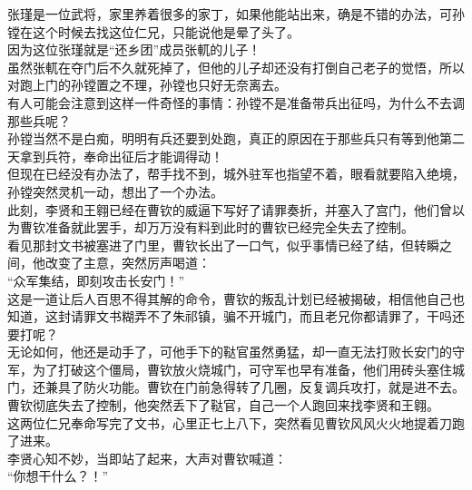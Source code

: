 \begin{multicols}{\theparacolNo}
张瑾是一位武将，家里养着很多的家丁，如果他能站出来，确是不错的办法，可孙镗在这个时候去找这位仁兄，只能说他是晕了头了。\\

因为这位张瑾就是“还乡团”成员张軏的儿子！\\

虽然张軏在夺门后不久就死掉了，但他的儿子却还没有打倒自己老子的觉悟，所以对跑上门的孙镗置之不理，孙镗也只好无奈离去。\\

有人可能会注意到这样一件奇怪的事情：孙镗不是准备带兵出征吗，为什么不去调那些兵呢？\\

孙镗当然不是白痴，明明有兵还要到处跑，真正的原因在于那些兵只有等到他第二天拿到兵符，奉命出征后才能调得动！\\

但现在已经没有办法了，帮手找不到，城外驻军也指望不着，眼看就要陷入绝境，孙镗突然灵机一动，想出了一个办法。\\

此刻，李贤和王翱已经在曹钦的威逼下写好了请罪奏折，并塞入了宫门，他们曾以为曹钦准备就此罢手，却万万没有料到此时的曹钦已经完全失去了控制。\\

看见那封文书被塞进了门里，曹钦长出了一口气，似乎事情已经了结，但转瞬之间，他改变了主意，突然厉声喝道：\\

“众军集结，即刻攻击长安门！”\\

这是一道让后人百思不得其解的命令，曹钦的叛乱计划已经被揭破，相信他自己也知道，这封请罪文书糊弄不了朱祁镇，骗不开城门，而且老兄你都请罪了，干吗还要打呢？\\

无论如何，他还是动手了，可他手下的鞑官虽然勇猛，却一直无法打败长安门的守军，为了打破这个僵局，曹钦放火烧城门，可守军也早有准备，他们用砖头塞住城门，还兼具了防火功能。曹钦在门前急得转了几圈，反复调兵攻打，就是进不去。\\

曹钦彻底失去了控制，他突然丢下了鞑官，自己一个人跑回来找李贤和王翱。\\

这两位仁兄奉命写完了文书，心里正七上八下，突然看见曹钦风风火火地提着刀跑了进来。\\

李贤心知不妙，当即站了起来，大声对曹钦喊道：\\

“你想干什么？！”\\


\end{multicols}
